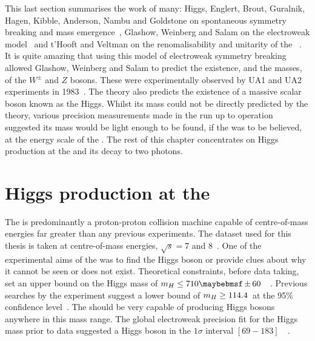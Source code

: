 This last section summarises the work of many: Higgs, Englert, Brout, Guralnik, Hagen, Kibble, Anderson, Nambu and Goldstone on spontaneous symmetry breaking and mass emergence~\cite{englert-brout,HagenKibble,Higgs:1964ia,Higgs,Nambu,Goldstone,Anderson}, Glashow, Weinberg and Salam on the electroweak model~\cite{Glashow,Weinberg,Salam} and t'Hooft and Veltman on the renomalisability and unitarity of the \SM~\cite{tHooft:1972fi,Hooft1971167}. It is quite amazing that using this model of electroweak symmetry breaking allowed Glashow, Weinberg and Salam to predict the existence, and the masses, of the $W^{\pm}$ and $Z$ bosons. These were experimentally observed by UA1 and UA2 experiments in 1983~\cite{ua1,ua2}. The theory also predicts the existence of a massive scalar boson known as the Higgs. Whilst its mass could not be directly predicted by the theory, various precision measurements made in the run up to \LHC operation suggested its mass would be light enough to be found, if the \SM was to be believed, at the energy scale of the \LHC. The rest of this chapter concentrates on Higgs production at the \LHC and its decay to two photons. 

\section{Higgs production at the \LHC}

The \LHC is predominantly a proton-proton collision machine capable of centre-of-mass energies far greater than any previous experiments. The dataset used for this thesis is taken at centre-of-mass energies, $\sqrt{s}=7$ and 8~\TeV. One of the experimental aims of the \LHC was to find the Higgs boson or provide clues about why it cannot be seen or does not exist. Theoretical constraints, before \LHC data taking, set an upper bound on the \SM Higgs mass of $\mH\leq710\pm60$~\GeV~\cite{upper-higgs-bound}. Previous searches by the \LEP experiment suggest a lower bound of $m_{H}\geq114.4$~\GeV at the 95\% confidence level~\cite{lep-higgs}. The \LHC should be very capable of producing \SM Higgs bosons anywhere in this mass range. The global electroweak precision fit for the Higgs mass prior to \LHC data suggested a \SM Higgs boson in the $1\sigma$ interval $[69-183]$~\GeV~\cite{ewfits}.

